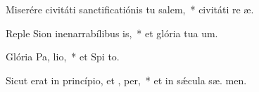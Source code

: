 \item Miserére civitáti sanctificatiónis tu salem,~* civitáti re æ.
\item Reple Sion inenarrabílibus  is,~* et glória tua  um.
\item Glória Pa,  lio,~* et Spi to.
\item Sicut erat in princípio, et ,  per,~* et in sǽcula sæ. men.
